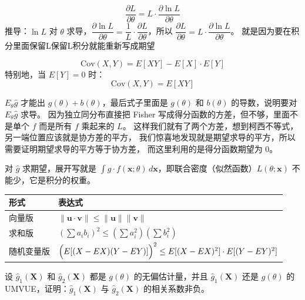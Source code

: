\begin{dxtips}[对数导数技巧]
$$\frac{\partial L}{\partial\theta} = L\cdot\frac{\partial \ln L}{\partial\theta}$$
推导：$\ln L$ 对 $\theta$ 求导，$\dfrac{\partial \ln L}{\partial\theta} = \dfrac{1}{L}\cdot\dfrac{\partial L}{\partial\theta}$，所以 $\dfrac{\partial L}{\partial\theta} = L\cdot\dfrac{\partial \ln L}{\partial\theta}$。
就是因为要在积分里面保留L保留L积分就能重新写成期望
\end{dxtips}

\begin{note}[协方差基础公式]
$$\mathrm{Cov}(X,Y) = E[XY] - E[X]\cdot E[Y]$$
特别地，当 $E[Y]=0$ 时：
$$\mathrm{Cov}(X,Y) = E[XY]$$
\end{note}
\begin{dxtips}
$E_\theta\hat{g}$ 才能出 $g(\theta)+b(\theta)$，最后式子里面是 $g(\theta)$ 和 $b(\theta)$ 的导数，说明要对 $E_\theta\hat{g}$ 求导。
因为独立同分布直接把 Fisher 写成得分函数的方差，但不够，里面不是单个 $f$ 而是所有 $f$ 乘起来的 $L$。
这样我们就有了两个方差，想到柯西不等式，另一端位置应该就是协方差的平方，
我们惊喜地发现就是期望求导的平方，所以需要证明期望求导的平方等于协方差，
而这里利用的是得分函数期望为 $0$。
\end{dxtips}
\begin{dxtips}
    对 $\hat{g}$ 求期望，展开写就是 $\int \hat{g} \cdot f(\mathbf{x};\theta)\,d\mathbf{x}$，即联合密度（似然函数）$L(\theta;\mathbf{x})$ 不能少，它是积分的权重。
\end{dxtips}
\begin{dxtips}
   [柯西-施瓦茨不等式]
\begin{center}
\begin{tabular}{ll}
\hline
形式 & 表达式 \\
\hline
向量版 & $\|\boldsymbol{u}\cdot\boldsymbol{v}\| \leq \|\boldsymbol{u}\|\|\boldsymbol{v}\|$ \\[6pt]
求和版 & $\left(\displaystyle\sum a_i b_i\right)^{\!2} \leq \left(\displaystyle\sum a_i^2\right)\left(\displaystyle\sum b_i^2\right)$ \\[6pt]
随机变量版 & $\Bigl(E[(X-EX)(Y-EY)]\Bigr)^2 \leq E[(X-EX)^2]\cdot E[(Y-EY)^2]$ \\
\hline
\end{tabular}
\end{center}

\end{dxtips}
\begin{homework}[15]
设 $\hat{g}_1(\boldsymbol{X})$ 和 $\hat{g}_2(\boldsymbol{X})$ 都是 $g(\theta)$ 的无偏估计量，并且 $\hat{g}_1(\boldsymbol{X})$ 还是 $g(\theta)$ 的 UMVUE，证明：$\hat{g}_1(\boldsymbol{X})$ 与 $\hat{g}_2(\boldsymbol{X})$ 的相关系数非负。
\end{homework}
